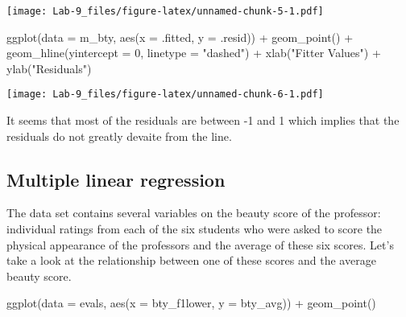 \documentclass[
]{article}
\newenvironment{Shaded}{\begin{snugshade}}{\end{snugshade}}
\newcommand{\AttributeTok}[1]{\textcolor[rgb]{0.77,0.63,0.00}{#1}}
\newcommand{\DecValTok}[1]{\textcolor[rgb]{0.00,0.00,0.81}{#1}}
\newcommand{\FunctionTok}[1]{\textcolor[rgb]{0.00,0.00,0.00}{#1}}
\newcommand{\NormalTok}[1]{#1}
\newcommand{\OtherTok}[1]{\textcolor[rgb]{0.56,0.35,0.01}{#1}}
\newcommand{\SpecialCharTok}[1]{\textcolor[rgb]{0.00,0.00,0.00}{#1}}
\newcommand{\StringTok}[1]{\textcolor[rgb]{0.31,0.60,0.02}{#1}}
\begin{document}
\begin{Shaded}
\end{Shaded}

\texttt{[image: Lab-9\_files/figure-latex/unnamed-chunk-5-1.pdf]}

\begin{Shaded}
\begin{Highlighting}[]
\FunctionTok{ggplot}\NormalTok{(}\AttributeTok{data =}\NormalTok{ m\_bty, }\FunctionTok{aes}\NormalTok{(}\AttributeTok{x =}\NormalTok{ .fitted, }\AttributeTok{y =}\NormalTok{ .resid)) }\SpecialCharTok{+} \FunctionTok{geom\_point}\NormalTok{() }\SpecialCharTok{+} \FunctionTok{geom\_hline}\NormalTok{(}\AttributeTok{yintercept =} \DecValTok{0}\NormalTok{,}
    \AttributeTok{linetype =} \StringTok{"dashed"}\NormalTok{) }\SpecialCharTok{+} \FunctionTok{xlab}\NormalTok{(}\StringTok{"Fitter Values"}\NormalTok{) }\SpecialCharTok{+} \FunctionTok{ylab}\NormalTok{(}\StringTok{"Residuals"}\NormalTok{)}
\end{Highlighting}
\end{Shaded}

\texttt{[image: Lab-9\_files/figure-latex/unnamed-chunk-6-1.pdf]}

It seems that most of the residuals are between -1 and 1 which implies
that the residuals do not greatly devaite from the line.

\hypertarget{multiple-linear-regression}{%
\subsection{Multiple linear
regression}\label{multiple-linear-regression}}

The data set contains several variables on the beauty score of the
professor: individual ratings from each of the six students who were
asked to score the physical appearance of the professors and the average
of these six scores. Let's take a look at the relationship between one
of these scores and the average beauty score.

\begin{Shaded}
\begin{Highlighting}[]
\FunctionTok{ggplot}\NormalTok{(}\AttributeTok{data =}\NormalTok{ evals, }\FunctionTok{aes}\NormalTok{(}\AttributeTok{x =}\NormalTok{ bty\_f1lower, }\AttributeTok{y =}\NormalTok{ bty\_avg)) }\SpecialCharTok{+} \FunctionTok{geom\_point}\NormalTok{()}
\end{Highlighting}
\end{Shaded}
\end{document}
